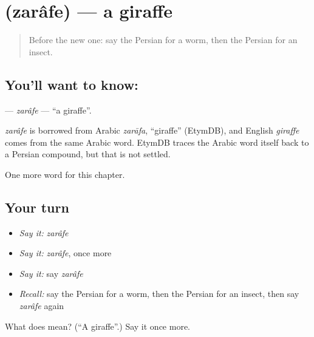 \section[\texorpdfstring{\fa{زرافه} (zarâfe)}{زرافه (zarâfe)}]{ (zarâfe) — a giraffe}

\label{lesson:FA-C121-zarafe}



\begin{quote}
Before the new one: say the Persian for a worm, then the Persian for an insect.
\end{quote}

\subsection*{You'll want to know: }
\textbf{} — \emph{zarâfe} — \textquotedblleft{}a giraffe\textquotedblright{}.

\begin{cousinweb}
\emph{zarâfe} is borrowed from Arabic \emph{zarāfa}, \textquotedblleft{}giraffe\textquotedblright{} (EtymDB), and English \emph{giraffe} comes from the same Arabic word. EtymDB traces the Arabic word itself back to a Persian compound, but that is not settled.
\end{cousinweb}

\begin{grammarlens}[title={What you've built}]
One more word for this chapter.
\end{grammarlens}

\subsection*{Your turn}
\begin{itemize}
\raggedright
  \item \emph{Say it:} \emph{zarâfe}
  \item \emph{Say it:} \emph{zarâfe}, once more
  \item \emph{Say it:} say \emph{zarâfe}
  \item \emph{Recall:} say the Persian for a worm, then the Persian for an insect, then say \emph{zarâfe} again
\end{itemize}

\begin{tcolorbox}[breakable,colback=teal!4,colframe=teal!35!black,title={Before you move on}]
What does  mean? (\textquotedblleft{}A giraffe\textquotedblright{}.) Say it once more.
\end{tcolorbox}
